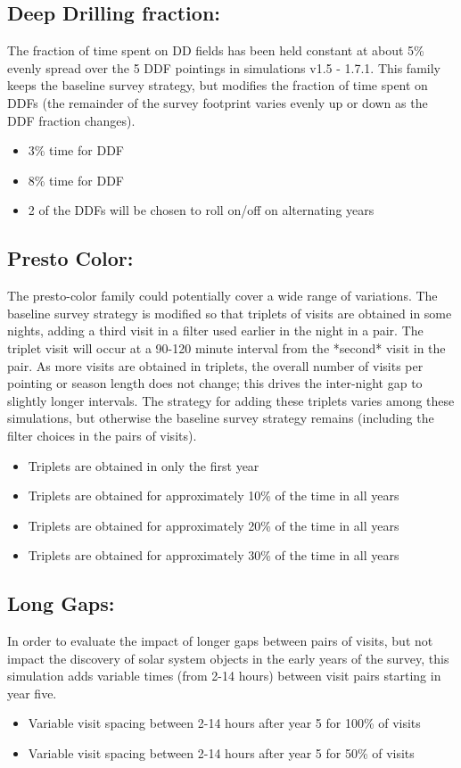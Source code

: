 \subsection{Deep Drilling fraction:}
The fraction of time spent on DD fields has been held constant at about 5\% evenly spread over the 5 DDF pointings in simulations v1.5 - 1.7.1. This family keeps the baseline survey strategy, but modifies the fraction of time spent on DDFs (the remainder of the survey footprint varies evenly up or down as the DDF fraction changes).
\begin{itemize}
\item 3\% time for DDF
\item 8\% time for DDF
\item 2 of the DDFs will be chosen to roll on/off on alternating years 
\end{itemize}

\subsection{Presto Color:}
The presto-color family could potentially cover a wide range of variations. The baseline survey strategy is modified so that triplets of visits are obtained in some nights, adding a third visit in a filter used earlier in the night in a pair. The triplet visit will occur at a 90-120 minute interval from the *second* visit in the pair. As more visits are obtained in triplets, the overall number of visits per pointing or season length does not change; this drives the inter-night gap to slightly longer intervals. The strategy for adding these triplets varies among these simulations, but otherwise the baseline survey strategy remains (including the filter choices in the pairs of visits).
\begin{itemize}
\item Triplets are obtained in only the first year
\item Triplets are obtained for approximately 10\% of the time in all years
\item Triplets are obtained for approximately 20\% of the time in all years
\item Triplets are obtained for approximately 30\% of the time in all years
\end{itemize}

\subsection{Long Gaps:}
In order to evaluate the impact of longer gaps between pairs of visits, but not impact the discovery of solar system objects in the early years of the survey, this simulation adds variable times (from 2-14 hours) between visit pairs starting in year five. 
\begin{itemize}
\item Variable visit spacing between 2-14 hours after year 5 for 100\% of visits
\item Variable visit spacing between 2-14 hours after year 5 for 50\% of visits
\end{itemize}


